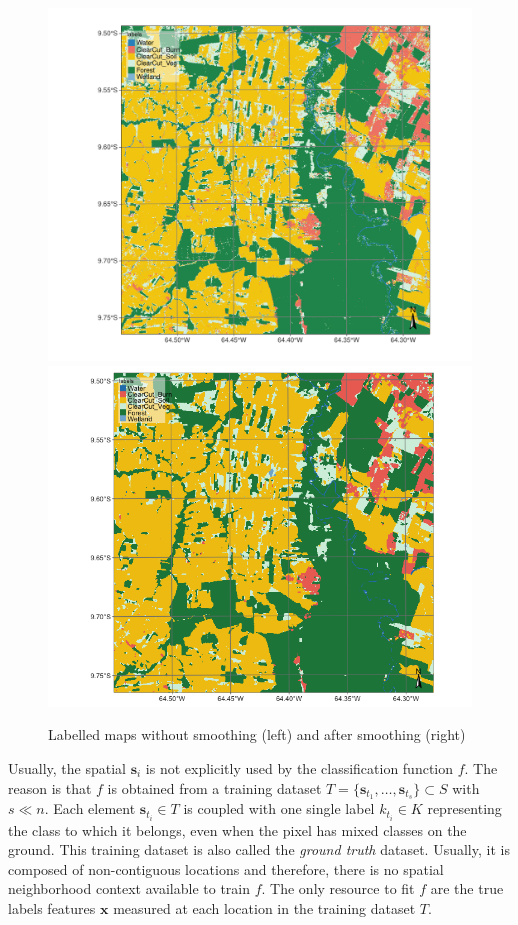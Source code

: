 \documentclass[
  shortnames]{jss}
\begin{document}
\begin{CodeChunk}
\begin{figure}[h]

{\centering \includegraphics[width=0.49\linewidth,height=0.25\textheight]{images/map_no_smooth} \includegraphics[width=0.49\linewidth,height=0.25\textheight]{images/map_smooth} 

}

\caption[Labelled maps without smoothing (left) and after smoothing (right) ]{Labelled maps without smoothing (left) and after smoothing (right) }\label{fig:maps}
\end{figure}
\end{CodeChunk}

Usually, the spatial \(\mathbf{s}_i\) is not explicitly used by the classification function \(f\). The reason is that \(f\) is obtained from a training dataset \(T = \{ \mathbf{s}_{t_1}, \ldots, \mathbf{s}_{t_s} \} \subset S\) with \(s \ll n\). Each element \(\mathbf{s}_{t_i} \in T\) is coupled with one single label \(k_{t_i} \in K\) representing the class to which it belongs, even when the pixel has mixed classes on the ground. This training dataset is also called the \textit{ground truth} dataset. Usually, it is composed of non-contiguous locations and therefore, there is no spatial neighborhood context available to train \(f\). The only resource to fit \(f\) are the true labels features \(\mathbf{x}\) measured at each location in the training dataset \(T\).
\end{document}
